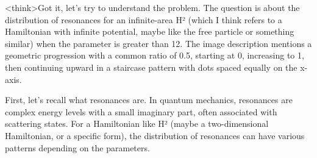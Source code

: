 <think>Got it, let's try to understand the problem. The question is about the distribution of resonances for an infinite-area H² (which I think refers to a Hamiltonian with infinite potential, maybe like the free particle or something similar) when the parameter is greater than 12. The image description mentions a geometric progression with a common ratio of 0.5, starting at 0, increasing to 1, then continuing upward in a staircase pattern with dots spaced equally on the x-axis.

First, let's recall what resonances are. In quantum mechanics, resonances are complex energy levels with a small imaginary part, often associated with scattering states. For a Hamiltonian like H² (maybe a two-dimensional Hamiltonian, or a specific form), the distribution of resonances can have various patterns depending on the parameters.

